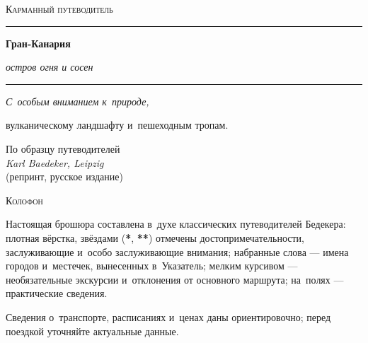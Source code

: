 \thispagestyle{empty}
\begin{center}
  \vspace*{2cm}
  {\color{baedmute}\scshape\large Карманный путеводитель}\par
  \vspace{0.4cm}
  {\color{baedrule}\rule{0.7\linewidth}{0.4pt}}\par
  \vspace{0.6cm}
  {\Huge\bfseries\color{baedred}Гран-Канария}\par
  \vspace{0.3cm}
  {\Large\itshape\color{baedink}остров огня и сосен}\par
  \vspace{0.8cm}
  {\color{baedrule}\rule{0.4\linewidth}{0.4pt}}\par
  \vfill
  {\color{baedsepia}\itshape
    С~особым вниманием к~природе,\par
    вулканическому ландшафту и~пешеходным тропам.}\par
  \vspace{1.2cm}
  {\small\color{baedmute}
    По образцу путеводителей\\
    \textit{Karl Baedeker, Leipzig}\\
    (репринт, русское издание)}\par
  \vspace{1cm}
\end{center}

\clearpage
\thispagestyle{empty}
\vspace*{\fill}
\begin{flushleft}\small\color{baedmute}
\textsc{Колофон}\par\vspace{0.3em}
Настоящая брошюра составлена в~духе классических путеводителей Бедекера:
плотная вёрстка, звёздами (\textcolor{baedred}{\textbf{*}},
\textcolor{baedred}{\textbf{**}}) отмечены достопримечательности,
заслуживающие и~особо заслуживающие внимания; набранные
\textbf{} слова --- имена городов и~местечек, вынесенных
в~Указатель; мелким курсивом --- необязательные экскурсии и~отклонения
от основного маршрута; на~полях --- практические сведения.

\vspace{0.6em}
Сведения о~транспорте, расписаниях и~ценах даны ориентировочно; перед
поездкой уточняйте актуальные данные.
\end{flushleft}
\vspace*{\fill}

\clearpage
\tableofcontents
\clearpage
